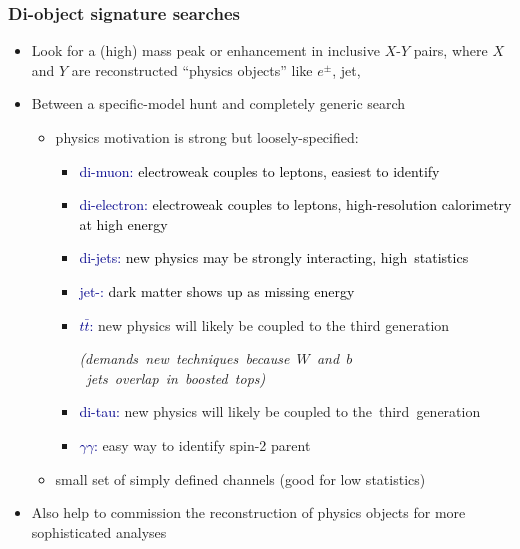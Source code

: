 \documentclass[compress]{beamer}
\begin{document}

\begin{frame}
\frametitle{Di-object signature searches}

\begin{itemize}\setlength{\itemsep}{0.3 cm}
\item Look for a (high) mass peak or enhancement in inclusive $X$-$Y$ pairs,
  where $X$ and $Y$ are reconstructed ``physics objects'' like $e^\pm$, jet, \met

\item Between a specific-model hunt and completely generic search
\begin{itemize}\setlength{\itemsep}{0.1 cm}
\item physics motivation is strong but loosely-specified:
\begin{itemize}\setlength{\itemsep}{0.1 cm}
\item<1-| alert@1> \textcolor{darkblue}{di-muon:} \textcolor{black}{electroweak couples to leptons, easiest to identify}
\item<1-| alert@1> \textcolor{darkblue}{di-electron:} \textcolor{black}{electroweak couples to leptons, high-resolution calorimetry at high energy}
\item<1-| alert@1> \textcolor{darkblue}{di-jets:} \textcolor{black}{new physics may be strongly interacting,} \mbox{\textcolor{black}{high statistics}\hspace{-1 cm}}
\item<1-| alert@1> \textcolor{darkblue}{jet-\met:} \textcolor{black}{dark matter shows up as missing energy}
\item \textcolor{darkblue}{$t\bar{t}$:} new physics will likely be coupled to the third generation

\mbox{\scriptsize \it (demands new techniques because $W$ and $b$ jets overlap in boosted tops)\hspace{-1 cm}}
\item \textcolor{darkblue}{di-tau:} new physics will likely be coupled to \mbox{the third generation\hspace{-1 cm}}
\item \textcolor{darkblue}{$\gamma\gamma$:} easy way to identify spin-2 parent
\end{itemize}


\item small set of simply defined channels (good for low statistics)
\end{itemize}

\item Also help to commission the reconstruction of physics objects
  for more sophisticated analyses
\end{itemize}
\end{frame}
\end{document}
